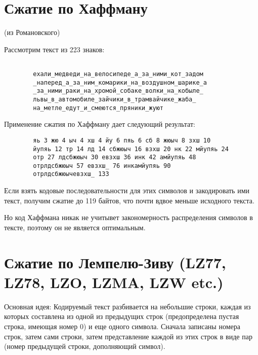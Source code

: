 
\section{Сжатие по Хаффману}

\begin{eg}(из Романовского)

    Рассмотрим текст из 223 знаков:

    \begin{verbatim}
       
        ехали_медведи_на_велосипеде_а_за_ними_кот_задом
        _наперед_а_за_ним_комарики_на_воздушном_шарике_а
        _за_ними_раки_на_хромой_собаке_волки_на_кобыле_
        львы_в_автомобиле_зайчики_в_трамвайчике_жаба_
        на_метле_едут_и_смеются_пряники_жуют

    \end{verbatim}

    Применение сжатия по Хаффману дает следующий результат:

    \begin{verbatim}
        яь 3 жю 4 ыч 4 хш 4 йу 6 пяь 6 сб 8 жюыч 8 зхш 10
        йупяь 12 тр 14 лд 14 сбжюыч 16 взхш 20 нк 22 мйупяь 24
        отр 27 лдсбжюыч 30 евзхш 36 инк 42 амйупяь 48
        отрлдсбжюыч 57 евзхш_ 76 инкамйупяь 90
        отрлдсбжюычевзхш_ 133
    \end{verbatim}

    Если взять кодовые последовательности для этих символов и закодировать ими текст,
    получим сжатие до 119 байтов, что почти вдвое меньше исходного текста.
\end{eg}

Но код Хаффмана никак не учитывет закономерность распределения символов в тексте, поэтому
он не является оптимальным.

\section{Сжатие по Лемпелю-Зиву (LZ77, LZ78, LZO, LZMA, LZW etc.)}

\begin{algoritm}
    
    Основная идея: Кодируемый текст разбивается 
    на небольшие строки, каждая из которых 
    составлена из одной из предыдущих строк 
    (предопределена пустая строка, имеющая номер 0) и еще одного символа. 
    Сначала записаны номера строк, затем сами 
    строки, затем представление каждой из этих 
    строк в виде пар (номер предыдущей строки‚ дополняющий символ). 
\end{algoritm}

